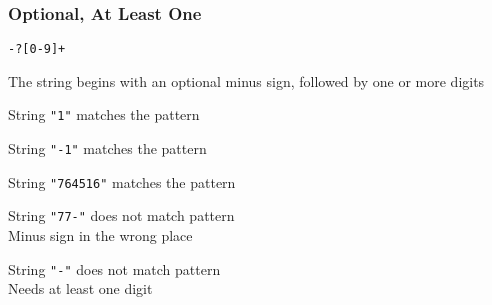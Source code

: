 \begin{frame}
  \frametitle{Optional, At Least One}
  \begin{center}
    \texttt{-?[0-9]+}
  \end{center}
  \begin{center}
    The string begins with an optional minus sign, followed
    by one or more digits
  \end{center}
  \begin{overprint}
    \begin{center}
      String \texttt{"1"} matches the pattern \\[2mm]
    \end{center}

    \begin{center}
      String \texttt{"-1"} matches the pattern \\[2mm]
    \end{center}

    \begin{center}
      String \texttt{"764516"} matches the pattern \\[2mm]
    \end{center}

    \begin{center}
      String \texttt{"77-"} does not match pattern \\[2mm]
      Minus sign in the wrong place
    \end{center}

    \begin{center}
      String \texttt{"-"} does not match pattern \\[2mm]
      Needs at least one digit
    \end{center}
  \end{overprint}
\end{frame}

